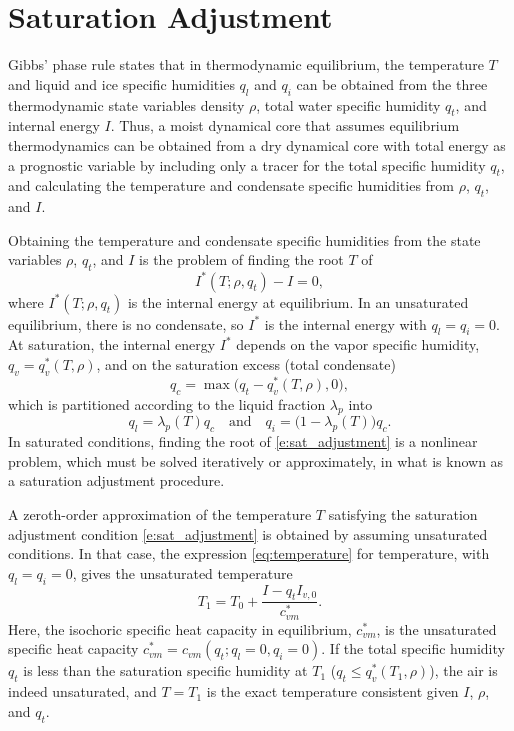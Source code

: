 \documentclass{report}
\begin{document}
\section{Saturation Adjustment}
\label{sct:sat_adj}
Gibbs' phase rule states that in thermodynamic equilibrium, the temperature $T$ and liquid and ice specific humidities $q_l$ and $q_i$ can be obtained from the three thermodynamic state variables density $\rho$, total water specific humidity $q_t$, and internal energy $I$. Thus, a moist dynamical core that assumes equilibrium thermodynamics can be obtained from a dry dynamical core with total energy as a prognostic variable by including only a tracer for the total specific humidity $q_t$, and calculating the temperature and condensate specific humidities from $\rho$, $q_t$, and $I$. 

Obtaining the temperature and condensate specific humidities from the state variables $\rho$, $q_t$, and $I$ is the problem of finding the root $T$ of
\begin{equation}\label{e:sat_adjustment}
I^*(T; \rho, q_t) - I = 0,
\end{equation}
where $I^*(T; \rho, q_t)$ is the internal energy at equilibrium. In an unsaturated equilibrium, there is no condensate, so $I^*$ is the internal energy with $q_l=q_i=0$. At saturation, the internal energy $I^*$ depends on the vapor specific humidity, $q_v = q_v^*(T, \rho)$, and on the saturation excess (total condensate) 
\begin{equation}
q_c = \max\bigl(q_t - q_v^*(T, \rho), 0\bigr), 
\end{equation}
which is partitioned according to the liquid fraction $\lambda_p$ into 
\begin{equation}\label{e:phase_partition}
q_l = \lambda_p(T) q_c \quad \text{and} \quad q_i = \bigl(1-\lambda_p(T)\bigr)q_c.
\end{equation} 
In saturated conditions, finding the root of \eqref{e:sat_adjustment} is a nonlinear problem, which must be solved iteratively or approximately, in what is known as a saturation adjustment procedure. 

A zeroth-order approximation of the temperature $T$ satisfying the saturation adjustment condition \eqref{e:sat_adjustment} is obtained by assuming unsaturated conditions. In that case, the expression \eqref{eq:temperature} for temperature, with $q_l=q_i=0$, gives the unsaturated temperature 
\begin{equation}
    T_1 = T_0 + \frac{I - q_t I_{v,0}}{c_{vm}^*}.
\end{equation}
Here, the isochoric specific heat capacity in equilibrium, $c_{vm}^*$, is the unsaturated specific heat capacity $c_{vm}^* = c_{vm}(q_t; q_l=0, q_i=0)$. If the total specific humidity $q_t$ is less than the saturation specific humidity at $T_1$ ($q_t \le q_v^*(T_1, \rho)$), the air is indeed unsaturated, and $T=T_1$ is the exact temperature consistent given $I$, $\rho$, and $q_t$. 
\end{document}
